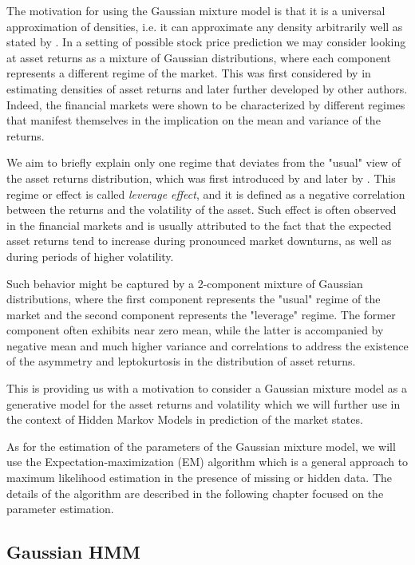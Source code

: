 The motivation for using the Gaussian mixture model is that it is a universal approximation of densities, i.e. it can approximate any density arbitrarily well as stated by \citep{Bishop2006}.
In a setting of possible stock price prediction we may consider looking at asset returns as a mixture of Gaussian distributions, where each component represents a different regime of the market.
This was first considered by \citep{Fama1965} in estimating densities of asset returns and later further developed by other authors. Indeed, the financial markets were shown to be
characterized by different regimes that manifest themselves in the implication on the mean and variance of the returns. \citep{Hamilton1989}

We aim to briefly explain only one regime that deviates from the "usual" view of the asset returns distribution, which was first 
introduced by \citep{Black1976} and later by \citep{Christie1982}. This regime or effect is called \textit{leverage effect}, 
and it is defined as a negative correlation between the returns and the volatility of the asset. Such effect is often observed in
the financial markets and is usually attributed to the fact that the expected asset returns tend to increase during 
pronounced market downturns, as well as during periods of higher volatility. \citep{Aydemir2007}

Such behavior might be captured by a 2-component mixture of Gaussian distributions, where the first component represents the "usual" regime 
of the market and the second component represents the "leverage" regime. The former component often exhibits near zero mean, while the latter 
is accompanied by negative mean and much higher variance and correlations to address the existence of the asymmetry and leptokurtosis in the distribution of 
asset returns. \citep{Paolella2015}

This is providing us with a motivation to consider a Gaussian mixture model as a generative model for the asset returns and volatility which 
we will further use in the context of Hidden Markov Models in prediction of the market states.

As for the estimation of the parameters of the Gaussian mixture model, we will use the Expectation-maximization (EM) algorithm which is a general
approach to maximum likelihood estimation in the presence of missing or hidden data. The details of the algorithm are described in the following chapter
focused on the parameter estimation. \citep{Dempster1977}

\subsection{Gaussian HMM}

